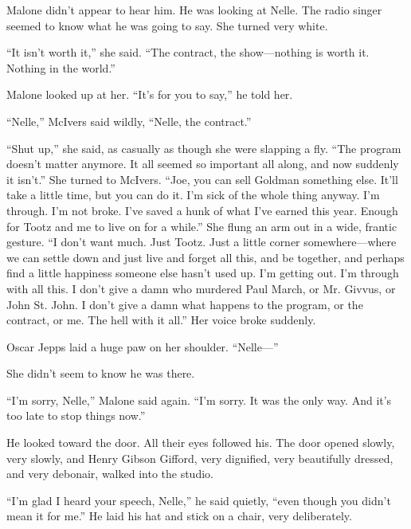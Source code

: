 \documentclass{novel}
\begin{document}
\begin{ChapterStart}
\vspace{3\nbs}
\end{ChapterStart}

Malone didn’t appear to hear him. He was looking at Nelle. The radio singer seemed to know what he was going to say. She turned very white.

“It isn’t worth it,” she said. “The contract, the show—nothing is worth it. Nothing in the world.”

Malone looked up at her. “It’s for you to say,” he told her.

“Nelle,” McIvers said wildly, “Nelle, the contract.”

“Shut up,” she said, as casually as though she were slapping a fly. “The program doesn’t matter anymore. It all seemed so important all along, and now suddenly it isn’t.” She turned to McIvers. “Joe, you can sell Goldman something else. It’ll take a little time, but you can do it. I'm sick of the whole thing anyway. I’m through. I’m not broke. I've saved a hunk of what I’ve earned this year. Enough for Tootz and me to live on for a while.” She flung an arm out in a wide, frantic gesture. “I don’t want much. Just Tootz. Just a little corner somewhere—where we can settle down and just live and forget all this, and be together, and perhaps find a little happiness someone else hasn’t used up. I’m getting out. I’m through with all this. I don’t give a damn who murdered Paul March, or Mr. Givvus, or John St. John. I don’t give a damn what happens to the program, or the contract, or me. The hell with it all.” Her voice broke suddenly.

Oscar Jepps laid a huge paw on her shoulder. “Nelle—”

She didn’t seem to know he was there.

“I’m sorry, Nelle,” Malone said again. “I’m sorry. It was the only way. And it’s too late to stop things now.”

He looked toward the door. All their eyes followed his. The door opened slowly, very slowly, and Henry Gibson Gifford, very dignified, very beautifully dressed, and very debonair, walked into the studio.

“I’m glad I heard your speech, Nelle,” he said quietly, “even though you didn’t mean it for me.” He laid his hat and stick on a chair, very deliberately.
\end{document}
